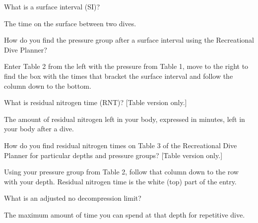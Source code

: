 	\begin{qanda}
		\begin{question}
What is a surface interval (SI)?
		\end{question}

		\begin{answer}
The time on the surface between two dives.
		\end{answer}
	\end{qanda}

	\begin{qanda}
		\begin{question}
How do you find the pressure group after a surface interval using the Recreational Dive Planner?
		\end{question}

		\begin{answer}
Enter Table 2 from the left with the pressure from Table 1, move to the right to find the box with the times that bracket the surface interval and follow the column down to the bottom.%
		\end{answer}
	\end{qanda}

	\begin{qanda}
		\begin{question}
What is residual nitrogen time (RNT)? [Table version only.]
		\end{question}

		\begin{answer}
The amount of residual nitrogen left in your body, expressed in minutes, left in your body after a dive.
		\end{answer}
	\end{qanda}

	\begin{qanda}
		\begin{question}
How do you find residual nitrogen times on Table 3 of the Recreational Dive Planner for particular depths and pressure groups? [Table version only.]
		\end{question}

		\begin{answer}
Using your pressure group from Table 2, follow that column down to the row with your depth.  Residual nitrogen time is the white (top) part of the entry.
		\end{answer}
	\end{qanda}

	\begin{qanda}
		\begin{question}
What is an adjusted no decompression limit?
		\end{question}

		\begin{answer}
The maximum amount of time you can spend at that depth for repetitive dive.
		\end{answer}
	\end{qanda}

